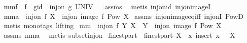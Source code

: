 \begin{isabellebody}
\endisatagproof
{\isafoldproof}%
%
\isadelimproof
\isanewline
%
\endisadelimproof
\isanewline
{}\isamarkupfalse%
\ mm{}{}f{\isacharcolon}\ \ {\isachardoublequoteopen}f\ {\isasymcirc}\ g{\isacharequal}id{\isachardoublequoteclose}\ \ {\isachardoublequoteopen}inj{\isacharunderscore}on\ g\ UNIV{\isachardoublequoteclose}%
\isadelimproof
\ %
\endisadelimproof
%
\isatagproof
{}\isamarkupfalse%
\ assms\ \isanewline
{}\isamarkupfalse%
\ {\isacharparenleft}metis\ inj{\isacharunderscore}on{\isacharunderscore}id\ inj{\isacharunderscore}on{\isacharunderscore}imageI{}{\isacharparenright}%
\endisatagproof
{\isafoldproof}%
%
\isadelimproof
%
\endisadelimproof
\isanewline
\isanewline
{}\isamarkupfalse%
\ mm{}{}a{\isacharcolon}\ \ {\isachardoublequoteopen}inj{\isacharunderscore}on\ f\ X{\isachardoublequoteclose}\ \ {\isachardoublequoteopen}inj{\isacharunderscore}on\ {\isacharparenleft}image\ f{\isacharparenright}\ {\isacharparenleft}Pow\ X{\isacharparenright}{\isachardoublequoteclose}\isanewline
%
\isadelimproof
%
\endisadelimproof
%
\isatagproof
{}\isamarkupfalse%
\ assms\ inj{\isacharunderscore}on{\isacharunderscore}image{\isacharunderscore}eq{\isacharunderscore}iff\ inj{\isacharunderscore}onI\ PowD\ \isamarkupfalse%
\ {\isacharparenleft}metis\ {\isacharparenleft}mono{\isacharunderscore}tags{\isacharcomma}\ lifting{\isacharparenright}{\isacharparenright}%
\endisatagproof
{\isafoldproof}%
%
\isadelimproof
\isanewline
%
\endisadelimproof
\isanewline
{}\isamarkupfalse%
\ mm{}{}{\isacharcolon}\ \ {\isachardoublequoteopen}inj{\isacharunderscore}on\ f\ Y{\isachardoublequoteclose}\ {\isachardoublequoteopen}X\ {\isasymsubseteq}\ Y{\isachardoublequoteclose}\ \ {\isachardoublequoteopen}inj{\isacharunderscore}on\ {\isacharparenleft}image\ f{\isacharparenright}\ {\isacharparenleft}Pow\ X{\isacharparenright}{\isachardoublequoteclose}\isanewline
%
\isadelimproof
%
\endisadelimproof
%
\isatagproof
{}\isamarkupfalse%
\ assms\ mm{}{}a\ \isamarkupfalse%
\ {\isacharparenleft}metis\ subset{\isacharunderscore}inj{\isacharunderscore}on{\isacharparenright}%
\endisatagproof
{\isafoldproof}%
%
\isadelimproof
\isanewline
%
\endisadelimproof
\isanewline
{}\isamarkupfalse%
\ finestpart\ \ {\isachardoublequoteopen}finestpart\ X\ {\isacharequal}\ {\isacharparenleft}{\isacharpercent}x{\isachardot}\ insert\ x\ {\isacharbraceleft}{\isacharbraceright}{\isacharparenright}\ {\isacharbackquote}\ X{\isachardoublequoteclose}\isanewline

\end{isabellebody}
